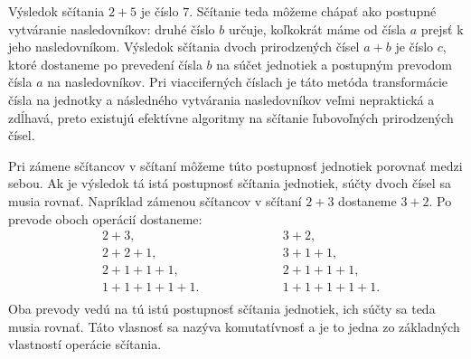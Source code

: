 \documentclass{report}
\begin{document}
Výsledok sčítania \(2 + 5\) je číslo \(7\). Sčítanie teda môžeme chápať ako postupné vytváranie nasledovníkov: druhé číslo \(b\) určuje, koľkokrát máme od čísla \(a\) prejsť k jeho nasledovníkom. Výsledok sčítania dvoch prirodzených čísel \(a + b\) je číslo \(c\), ktoré dostaneme po prevedení čísla \(b\) na súčet jednotiek a postupným prevodom čísla \(a\) na nasledovníkov. Pri viacciferných číslach je táto metóda transformácie čísla na jednotky a následného vytvárania nasledovníkov veľmi nepraktická a zdĺhavá, preto existujú efektívne algoritmy na sčítanie ľubovoľných prirodzených čísel.

Pri zámene sčítancov v sčítaní môžeme túto postupnosť jednotiek porovnať medzi sebou. Ak je výsledok tá istá postupnosť sčítania jednotiek, súčty dvoch čísel sa musia rovnať. Napríklad zámenou sčítancov v sčítaní \(2 + 3\) dostaneme \(3 + 2\). Po prevode oboch operácií dostaneme:
\[
\begin{aligned}
  &2 + 3, \\
  &2 + 2 + 1, \\
  &2 + 1 + 1 + 1, \\
  &1 + 1 + 1 + 1 + 1. \\
\end{aligned}
\hspace{5em}
\begin{aligned}
  &3 + 2, \\
  &3 + 1 + 1, \\
  &2 + 1 + 1 + 1, \\
  &1 + 1 + 1 + 1 + 1. \\
\end{aligned}
\]
Oba prevody vedú na tú istú postupnosť sčítania jednotiek, ich súčty sa teda musia rovnať. Táto vlasnosť sa nazýva komutatívnosť a je to jedna zo základných vlastností operácie sčítania.
\end{document}
